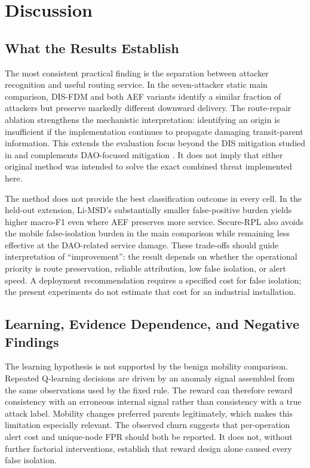 \section{Discussion}\label{sec:discussion}
\subsection{What the Results Establish}
The most consistent practical finding is the separation between attacker recognition and useful routing service. In the seven-attacker static main comparison, DIS-FDM and both AEF variants identify a similar fraction of attackers but preserve markedly different downward delivery. The route-repair ablation strengthens the mechanistic interpretation: identifying an origin is insufficient if the implementation continues to propagate damaging transit-parent information. This extends the evaluation focus beyond the DIS mitigation studied in \cite{prajisha2025} and complements DAO-focused mitigation \cite{limsd2024}. It does not imply that either original method was intended to solve the exact combined threat implemented here.

The method does not provide the best classification outcome in every cell. In the held-out extension, Li-MSD's substantially smaller false-positive burden yields higher macro-F1 even where AEF preserves more service. Secure-RPL also avoids the mobile false-isolation burden in the main comparison while remaining less effective at the DAO-related service damage. These trade-offs should guide interpretation of ``improvement'': the result depends on whether the operational priority is route preservation, reliable attribution, low false isolation, or alert speed. A deployment recommendation requires a specified cost for false isolation; the present experiments do not estimate that cost for an industrial installation.

\subsection{Learning, Evidence Dependence, and Negative Findings}
The learning hypothesis is not supported by the benign mobility comparison. Repeated Q-learning decisions are driven by an anomaly signal assembled from the same observations used by the fixed rule. The reward can therefore reward consistency with an erroneous internal signal rather than consistency with a true attack label. Mobility changes preferred parents legitimately, which makes this limitation especially relevant. The observed churn suggests that per-operation alert cost and unique-node FPR should both be reported. It does not, without further factorial interventions, establish that reward design alone caused every false isolation.

